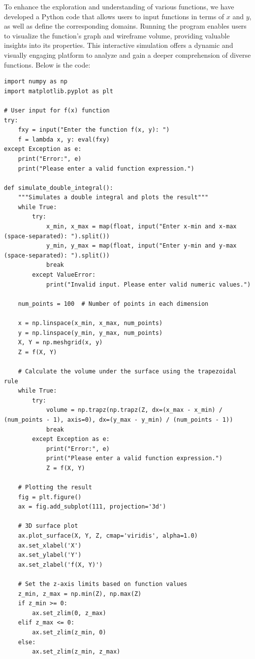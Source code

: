 \documentclass[13pt,a4paper]{report}
\begin{document}
To enhance the exploration and understanding of various functions, we have developed a Python code that allows users to input functions in terms of $x$ and $y$, as well as define the corresponding domains. Running the program enables users to visualize the function's graph and wireframe volume, providing valuable insights into its properties. This interactive simulation offers a dynamic and visually engaging platform to analyze and gain a deeper comprehension of diverse functions. Below is the code:\\[-0.3cm]

\begin{verbatim}
import numpy as np
import matplotlib.pyplot as plt

# User input for f(x) function
try:
    fxy = input("Enter the function f(x, y): ")
    f = lambda x, y: eval(fxy)
except Exception as e:
    print("Error:", e)
    print("Please enter a valid function expression.")

def simulate_double_integral():
    """Simulates a double integral and plots the result"""
    while True:
        try:
            x_min, x_max = map(float, input("Enter x-min and x-max (space-separated): ").split())
            y_min, y_max = map(float, input("Enter y-min and y-max (space-separated): ").split())
            break
        except ValueError:
            print("Invalid input. Please enter valid numeric values.")

    num_points = 100  # Number of points in each dimension

    x = np.linspace(x_min, x_max, num_points)
    y = np.linspace(y_min, y_max, num_points)
    X, Y = np.meshgrid(x, y)
    Z = f(X, Y)

    # Calculate the volume under the surface using the trapezoidal rule
    while True:
        try:
            volume = np.trapz(np.trapz(Z, dx=(x_max - x_min) / (num_points - 1), axis=0), dx=(y_max - y_min) / (num_points - 1))
            break
        except Exception as e:
            print("Error:", e)
            print("Please enter a valid function expression.")
            Z = f(X, Y)

    # Plotting the result
    fig = plt.figure()
    ax = fig.add_subplot(111, projection='3d')

    # 3D surface plot
    ax.plot_surface(X, Y, Z, cmap='viridis', alpha=1.0)
    ax.set_xlabel('X')
    ax.set_ylabel('Y')
    ax.set_zlabel('f(X, Y)')

    # Set the z-axis limits based on function values
    z_min, z_max = np.min(Z), np.max(Z)
    if z_min >= 0:
        ax.set_zlim(0, z_max)
    elif z_max <= 0:
        ax.set_zlim(z_min, 0)
    else:
        ax.set_zlim(z_min, z_max)


\end{verbatim}
\end{document}
